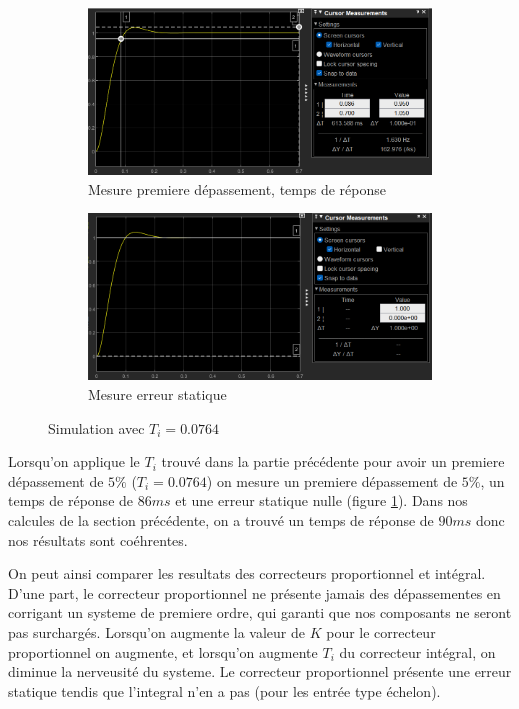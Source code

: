 \documentclass[12pt, a4paper]{report}
\begin{document}
\begin{figure}[H]
    \begin{subfigure}[h!]{0.4\linewidth}
        \includegraphics[width=\linewidth]{sim1123tr5prc1erdep.png}
        \caption{Mesure premiere dépassement, temps de réponse}
    \end{subfigure}
    \hfill
    \begin{subfigure}[h!]{0.4\linewidth}
        \includegraphics[width=\linewidth]{sim1123erreur.png}
        \caption{Mesure erreur statique}
    \end{subfigure}
    \caption{Simulation avec $T_i = 0.0764$}
    \label{fig:tipour5prc}
\end{figure}

Lorsqu'on applique le $T_i$ trouvé dans la partie précédente pour avoir un premiere dépassement de $5\%$
($T_i = 0.0764$) on mesure un premiere dépassement de $5\%$, un temps de réponse de $86ms$ et une erreur statique nulle (figure \ref{fig:tipour5prc}).
Dans nos calcules de la section précédente, on a trouvé un temps de réponse de $90ms$ donc nos résultats sont coéhrentes.

On peut ainsi comparer les resultats des correcteurs proportionnel et intégral. D'une part, le correcteur
proportionnel ne présente jamais des dépassementes en corrigant un systeme de premiere ordre, qui garanti 
que nos composants ne seront pas surchargés. Lorsqu'on augmente la valeur de $K$ pour le correcteur proportionnel 
on augmente, et lorsqu'on augmente $T_i$ du correcteur intégral, on diminue la nerveusité du systeme. Le correcteur proportionnel présente
une erreur statique tendis que l'integral n'en a pas (pour les entrée type échelon). 
\end{document}
